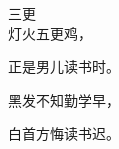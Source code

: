 \documentclass{article}
\begin{document}
三更\\灯火五更鸡，


正是男儿读书时。\par
\noindent 黑发不知勤学早，\newpage

白首方悔读书迟。
\end{document}

